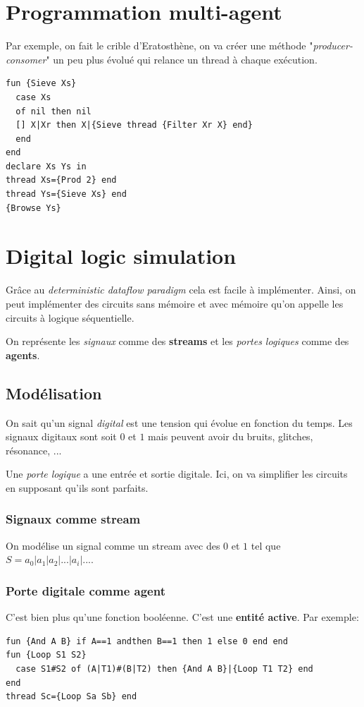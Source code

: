 \documentclass{report}
\begin{document}
\section{Programmation multi-agent}
Par exemple, on fait le crible d'Eratosthène, on va créer une méthode "\textit{producer-consomer}" un peu plus évolué qui relance un thread à chaque exécution. 
\begin{lstlisting}[escapechar=\%]
fun {Sieve Xs}
  case Xs
  of nil then nil
  [] X|Xr then X|{Sieve thread {Filter Xr X} end} 
  end
end 
declare Xs Ys in
thread Xs={Prod 2} end 
thread Ys={Sieve Xs} end
{Browse Ys}
\end{lstlisting}

\section{Digital logic simulation}
Grâce au \textit{deterministic dataflow paradigm} cela est facile à implémenter. Ainsi, on peut implémenter des circuits sans mémoire et avec mémoire qu'on appelle les circuits à logique séquentielle.\par
On représente les \textit{signaux} comme des \textbf{streams} et les \textit{portes logiques} comme des \textbf{agents}.

\subsection{Modélisation}
On sait qu'un signal \textit{digital} est une tension qui évolue en fonction du temps. Les signaux digitaux sont soit $0$ et $1$ mais peuvent avoir du bruits, glitches, résonance, ...\par
Une \textit{porte logique} a une entrée et sortie digitale. Ici, on va simplifier les circuits en supposant qu'ils sont parfaits.

\subsubsection{Signaux comme stream}
On modélise un signal comme un stream avec des $0$ et $1$ tel que $S=a_0 | a_1 | a_2 | ... | a_i | ...$.

\subsubsection{Porte digitale comme agent}
C'est bien plus qu'une fonction booléenne. C'est une \textbf{entité active}. Par exemple:
\begin{lstlisting}[escapechar=\%]
fun {And A B} if A==1 andthen B==1 then 1 else 0 end end 
fun {Loop S1 S2} 
  case S1#S2 of (A|T1)#(B|T2) then {And A B}|{Loop T1 T2} end
end
thread Sc={Loop Sa Sb} end
\end{lstlisting}
\end{document}
